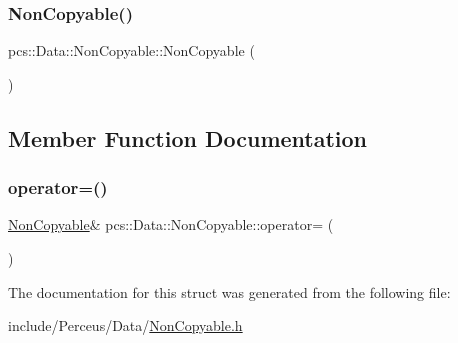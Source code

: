 \subsubsection{\texorpdfstring{Non\+Copyable()}{NonCopyable()}\hspace{0.1cm}{\footnotesize\ttfamily [2/2]}}
{\footnotesize\ttfamily pcs\+::\+Data\+::\+Non\+Copyable\+::\+Non\+Copyable (\begin{DoxyParamCaption}\item[{const \hyperlink{structpcs_1_1Data_1_1NonCopyable}{Non\+Copyable} \&}]{ }\end{DoxyParamCaption})}



\subsection{Member Function Documentation}
\mbox{\label{structpcs_1_1Data_1_1NonCopyable_a3fec6abd7a92cc27e19fe7361b3f0c24}} 
\subsubsection{\texorpdfstring{operator=()}{operator=()}}
{\footnotesize\ttfamily \hyperlink{structpcs_1_1Data_1_1NonCopyable}{Non\+Copyable}\& pcs\+::\+Data\+::\+Non\+Copyable\+::operator= (\begin{DoxyParamCaption}\item[{const \hyperlink{structpcs_1_1Data_1_1NonCopyable}{Non\+Copyable} \&}]{ }\end{DoxyParamCaption})}



The documentation for this struct was generated from the following file\+:\begin{DoxyCompactItemize}
\item 
include/\+Perceus/\+Data/\hyperlink{NonCopyable_8h}{Non\+Copyable.\+h}\end{DoxyCompactItemize}
